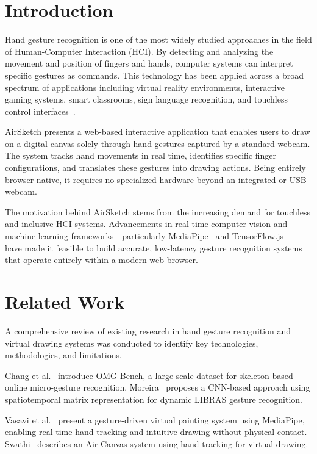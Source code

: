 \documentclass[conference]{IEEEtran}
\begin{document}
\section{Introduction}

Hand gesture recognition is one of the most widely studied approaches in the field of Human-Computer Interaction (HCI). By detecting and analyzing the movement and position of fingers and hands, computer systems can interpret specific gestures as commands. This technology has been applied across a broad spectrum of applications including virtual reality environments, interactive gaming systems, smart classrooms, sign language recognition, and touchless control interfaces~\cite{ref7}.

AirSketch presents a web-based interactive application that enables users to draw on a digital canvas solely through hand gestures captured by a standard webcam. The system tracks hand movements in real time, identifies specific finger configurations, and translates these gestures into drawing actions. Being entirely browser-native, it requires no specialized hardware beyond an integrated or USB webcam.

The motivation behind AirSketch stems from the increasing demand for touchless and inclusive HCI systems. Advancements in real-time computer vision and machine learning frameworks—particularly MediaPipe~\cite{ref3} and TensorFlow.js~\cite{ref10}—have made it feasible to build accurate, low-latency gesture recognition systems that operate entirely within a modern web browser.

\section{Related Work}

A comprehensive review of existing research in hand gesture recognition and virtual drawing systems was conducted to identify key technologies, methodologies, and limitations.

Chang et al.~\cite{ref1} introduce OMG-Bench, a large-scale dataset for skeleton-based online micro-gesture recognition. Moreira~\cite{ref2} proposes a CNN-based approach using spatiotemporal matrix representation for dynamic LIBRAS gesture recognition.

Vasavi et al.~\cite{ref3} present a gesture-driven virtual painting system using MediaPipe, enabling real-time hand tracking and intuitive drawing without physical contact. Swathi~\cite{ref4} describes an Air Canvas system using hand tracking for virtual drawing.
\end{document}
